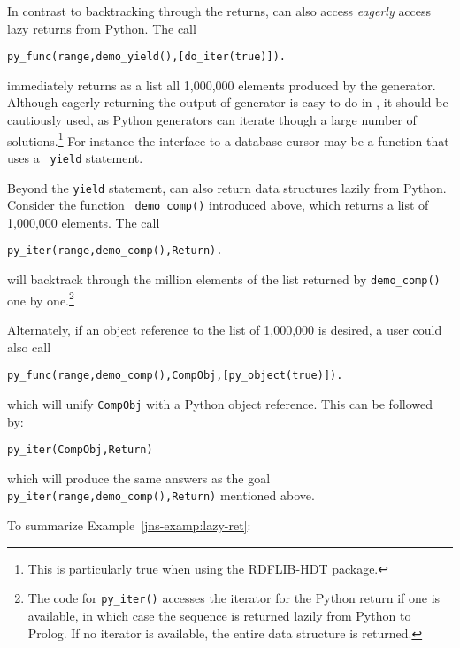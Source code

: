 \begin{example}
In contrast to backtracking through the returns, \janus{} can also access
{\em eagerly} access lazy returns from Python.  The call

{\tt py\_func(range,demo\_yield(),[do\_iter(true)]).}

\noindent
immediately returns as a list all 1,000,000 elements produced by the
generator.  Although eagerly returning the output of generator is easy
to do in \janus , it should be cautiously used, as Python generators can
iterate though a large number of solutions.\footnote{This is
particularly true when using the RDFLIB-HDT package.}  For instance
the interface to a database cursor may be a function that uses a {\tt
  yield} statement.

Beyond the {\tt yield} statement, \janus{} can also return data
structures lazily from Python.  Consider the function {\tt
  demo\_comp()} introduced above, which returns a list of 1,000,000
elements. The call

{\tt py\_iter(range,demo\_comp(),Return).}

\noindent
will backtrack through the million elements of the list returned by
{\tt demo\_comp()} one by one.\footnote{The code for {\tt py\_iter()}
accesses the iterator for the Python return if one is available, in
which case the sequence is returned lazily from Python to Prolog. If
no iterator is available, the entire data structure is returned.}

Alternately, if an object reference to the list of 1,000,000 is
desired, a user could also call 

{\tt py\_func(range,demo\_comp(),CompObj,[py\_object(true)]).}

which will unify {\tt CompObj} with a Python object reference.  This
can be followed by:

{\tt py\_iter(CompObj,Return)}

which will produce the same answers as the goal {\tt
  py\_iter(range,demo\_comp(),Return)} mentioned above.

\end{example}

To summarize Example~\ref{jns-examp:lazy-ret}:


